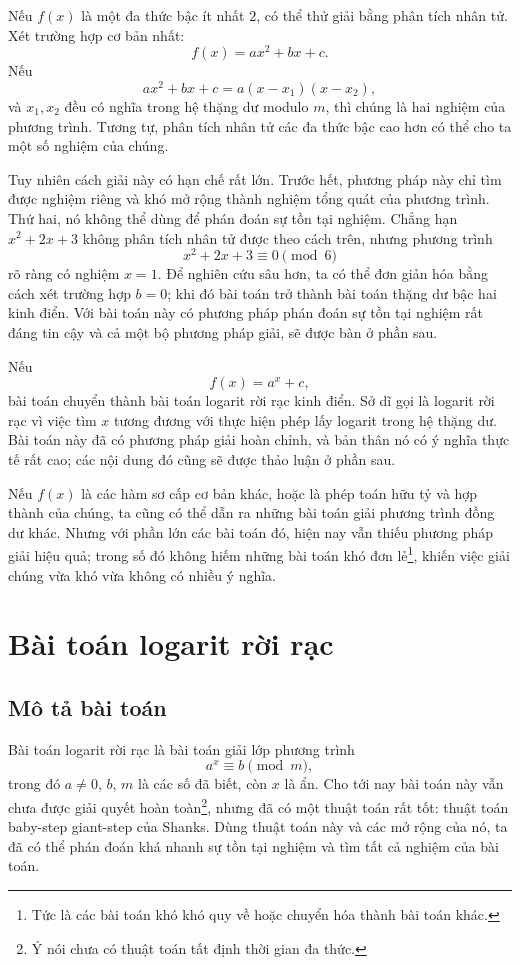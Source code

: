 \documentclass[11pt]{article}
\begin{document}
Nếu $f(x)$ là một đa thức bậc ít nhất $2$, có thể thử giải bằng phân tích
nhân tử. Xét trường hợp cơ bản nhất:
\[
  f(x)=ax^2+bx+c.
\]
Nếu
\[
  ax^2+bx+c=a(x-x_1)(x-x_2),
\]
và $x_1,x_2$ đều có nghĩa trong hệ thặng dư modulo $m$, thì chúng là hai
nghiệm của phương trình. Tương tự, phân tích nhân tử các đa thức bậc cao hơn
có thể cho ta một số nghiệm của chúng.

Tuy nhiên cách giải này có hạn chế rất lớn. Trước hết, phương pháp này chỉ
tìm được nghiệm riêng và khó mở rộng thành nghiệm tổng quát của phương trình.
Thứ hai, nó không thể dùng để phán đoán sự tồn tại nghiệm. Chẳng hạn
$x^2+2x+3$ không phân tích nhân tử được theo cách trên, nhưng phương trình
\[
  x^2+2x+3\equiv 0 \pmod 6
\]
rõ ràng có nghiệm $x=1$. Để nghiên cứu sâu hơn, ta có thể đơn giản hóa bằng
cách xét trường hợp $b=0$; khi đó bài toán trở thành bài toán thặng dư bậc hai
kinh điển. Với bài toán này có phương pháp phán đoán sự tồn tại nghiệm rất
đáng tin cậy và cả một bộ phương pháp giải, sẽ được bàn ở phần sau.

Nếu
\[
  f(x)=a^x+c,
\]
bài toán chuyển thành bài toán logarit rời rạc kinh điển. Sở dĩ gọi là
logarit rời rạc vì việc tìm $x$ tương đương với thực hiện phép lấy logarit
trong hệ thặng dư. Bài toán này đã có phương pháp giải hoàn chỉnh, và bản thân
nó có ý nghĩa thực tế rất cao; các nội dung đó cũng sẽ được thảo luận ở phần
sau.

Nếu $f(x)$ là các hàm sơ cấp cơ bản khác, hoặc là phép toán hữu tỷ và hợp
thành của chúng, ta cũng có thể dẫn ra những bài toán giải phương trình đồng
dư khác. Nhưng với phần lớn các bài toán đó, hiện nay vẫn thiếu phương pháp
giải hiệu quả; trong số đó không hiếm những bài toán khó đơn lẻ\footnote{Tức
là các bài toán khó khó quy về hoặc chuyển hóa thành bài toán khác.}, khiến
việc giải chúng vừa khó vừa không có nhiều ý nghĩa.

\section{Bài toán logarit rời rạc}

\subsection{Mô tả bài toán}

Bài toán logarit rời rạc là bài toán giải lớp phương trình
\[
  a^x\equiv b \pmod m,
\]
trong đó $a\ne 0$, $b$, $m$ là các số đã biết, còn $x$ là ẩn. Cho tới nay bài
toán này vẫn chưa được giải quyết hoàn toàn\footnote{Ý nói chưa có thuật toán
tất định thời gian đa thức.}, nhưng đã có một thuật toán rất tốt: thuật toán
baby-step giant-step của Shanks. Dùng thuật toán này và các mở rộng của nó, ta
đã có thể phán đoán khá nhanh sự tồn tại nghiệm và tìm tất cả nghiệm của bài
toán.
\end{document}
